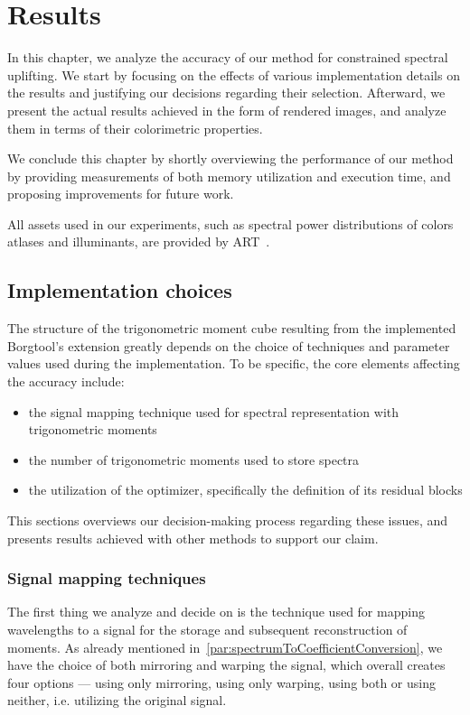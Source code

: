 \chapter{Results} \label{chap:results}

In this chapter, we analyze the accuracy of our method for constrained spectral uplifting. We start by focusing on the effects of various implementation details on the results and justifying our decisions regarding their selection. Afterward, we present the actual results achieved in the form of rendered images, and analyze them in terms of their colorimetric properties.

We conclude this chapter by shortly overviewing the performance of our method by providing measurements of both memory utilization and execution time, and proposing improvements for future work.

All assets used in our experiments, such as spectral power distributions of colors atlases and illuminants, are provided by ART~\cite{ART}.

\section{Implementation choices}

The structure of the trigonometric moment cube resulting from the implemented Borgtool's extension greatly depends on the choice of techniques and parameter values used during the implementation. To be specific, the core elements affecting the accuracy include:
\begin{itemize}
	\item the signal mapping technique used for spectral representation with trigonometric moments
	\item the number of trigonometric moments used to store spectra
	\item the utilization of the optimizer, specifically the definition of its residual blocks
\end{itemize}

This sections overviews our decision-making process regarding these issues, and presents results achieved with other methods to support our claim.

\subsection{Signal mapping techniques} \label{sec:storingMoments}
The first thing we analyze and decide on is the technique used for mapping wavelengths to a signal for the storage and subsequent reconstruction of moments. As already mentioned in~\cref{par:spectrumToCoefficientConversion}, we have the choice of both mirroring and warping the signal, which overall creates four options --- using only mirroring, using only warping, using both or using neither, i.e. utilizing the original signal.

